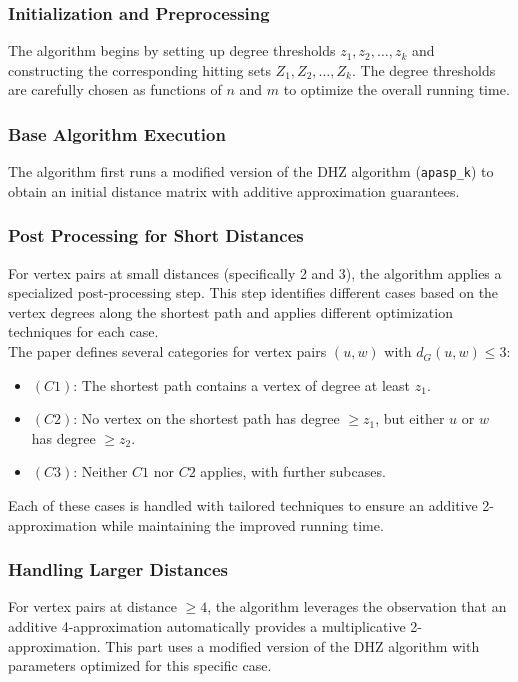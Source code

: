 \documentclass[a4paper,11pt,oneside]{book}
\begin{document}
\subsubsection{Initialization and Preprocessing}
The algorithm begins by setting up degree thresholds $z_1, z_2, \ldots, z_k$ and constructing the corresponding hitting sets $Z_1, Z_2, \ldots, Z_k$. The degree thresholds are carefully chosen as functions of $n$ and $m$ to optimize the overall running time.\\

\subsubsection{Base Algorithm Execution}
The algorithm first runs a modified version of the DHZ algorithm (\texttt{apasp\_k}) to obtain an initial distance matrix with additive approximation guarantees.\\

\subsubsection{Post Processing for Short Distances}
For vertex pairs at small distances (specifically 2 and 3), the algorithm applies a specialized post-processing step. This step identifies different cases based on the vertex degrees along the shortest path and applies different optimization techniques for each case.\\

The paper defines several categories for vertex pairs $(u,w)$ with $d_G(u,w) \leq 3$:
\begin{itemize}
    \item $(C1)$: The shortest path contains a vertex of degree at least $z_1$.
    \item $(C2)$: No vertex on the shortest path has degree $\geq z_1$, but either $u$ or $w$ has degree $\geq z_2$.
    \item $(C3)$: Neither $C1$ nor $C2$ applies, with further subcases.
\end{itemize}

Each of these cases is handled with tailored techniques to ensure an additive 2-approximation while maintaining the improved running time.\\

\subsubsection{Handling Larger Distances}
For vertex pairs at distance $\geq 4$, the algorithm leverages the observation that an additive 4-approximation automatically provides a multiplicative 2-approximation. This part uses a modified version of the DHZ algorithm with parameters optimized for this specific case.\\
\end{document}
